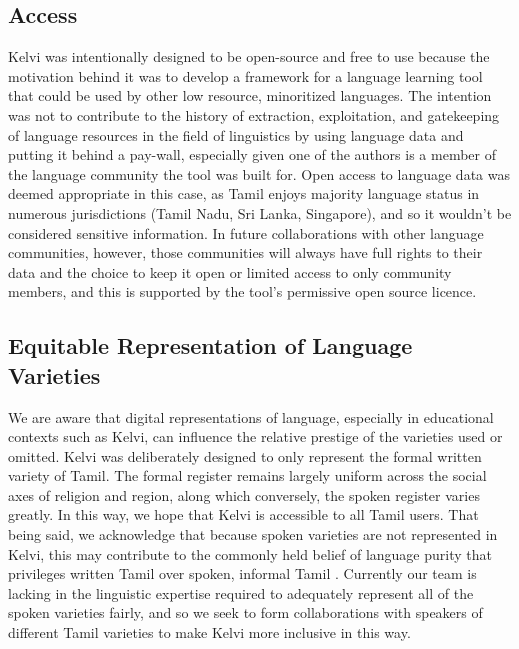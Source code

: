 \documentclass[11pt]{article}
\begin{document}
\subsection{Access}
Kelvi was intentionally designed to be open-source and free to use because the 
motivation behind it was to develop a framework for a language learning tool that 
could be used by other low resource, minoritized languages. The intention was not 
to contribute to the history of extraction, exploitation, and gatekeeping of 
language resources in the field of linguistics \citep{leonard_toward_2021} by 
using language data and putting it behind a pay-wall, especially given one of the 
authors is a member of the language community the tool was built for. 
Open access to language data was deemed appropriate in this case, as Tamil enjoys 
majority language status in numerous jurisdictions (Tamil Nadu, Sri Lanka, Singapore), 
and so it wouldn’t be considered sensitive information. In future collaborations with 
other language communities, however, those communities will always have full rights 
to their data and the choice to keep it open or limited access to only community members, 
and this is supported by the tool’s permissive open source licence.

\subsection{Equitable Representation of Language Varieties}
We are aware that digital representations of language, especially in educational contexts 
such as Kelvi, can influence the relative prestige of the varieties used or omitted. 
Kelvi was deliberately designed to only represent the formal written variety of Tamil. 
The formal register remains largely uniform across the social axes of religion and region, 
along which conversely, the spoken register varies greatly. In this way, we hope that 
Kelvi is accessible to all Tamil users. That being said, we acknowledge that because 
spoken varieties are not represented in Kelvi, this may contribute to the commonly 
held belief of language purity that privileges written Tamil over spoken, informal Tamil \citep{annamalai_social_2011}. 
Currently our team is lacking in the linguistic expertise required to adequately 
represent all of the spoken varieties fairly, and so we seek to form collaborations 
with speakers of different Tamil varieties to make Kelvi more inclusive in this way.
\end{document}
